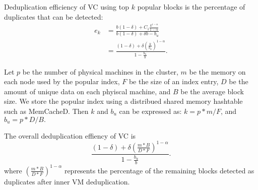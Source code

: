 Deduplication efficiency of VC using top $k$ popular blocks
is the percentage of duplicates that can be detected:  
\begin{equation}
\begin{split}
e_k &= 
\frac{ b(1-\delta) + C_1\frac{  k^{1-\alpha}} {1-\alpha}} 
{b(1-\delta)  + \delta b - b_u }\\
&= 
\frac{ (1-\delta) + \delta  (\frac{k}{b_u})^{1-\alpha}}
{ 1- \frac{b_u}{b} }.
\end{split}
\end{equation}






Let $p$ be the number of physical machines in the cluster, $m$ be the memory on each node used by the popular
index, $F$ be the size of an index entry,
$D$ be the amount of unique data on each phyiscal machine, and 
$B$ be the average block size. We store the popular index using a distribued shared memory hashtable
such as MemCacheD.  Then $k$ and $b_u$ can be expressed as:
$
k = p*m/F$, and $b_u = p*D/B.
$

The overall deduplication effiency of VC is
\[
\frac{ (1-\delta) + \delta (\frac{m*B}{D*F})^{1-\alpha}}
{ 1- \frac{b_u}{b} }.
\]
where $(\frac{m*B}{D*F})^{1-\alpha}$ represents the percentage of the remaining blocks detected as duplicates
after inner VM deduplication. 

